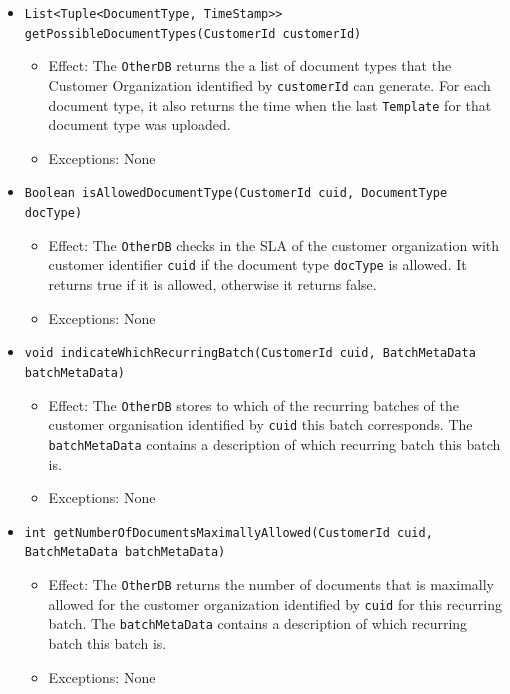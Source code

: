 \documentclass[a4paper,10pt]{article}
\begin{document}
\begin{itemize}
\begin{itemize}
		\item \texttt{List<Tuple<DocumentType, TimeStamp>> getPossibleDocumentTypes(CustomerId customerId)}
		\begin{itemize}
            \item Effect: The \texttt{OtherDB} returns the a list of document types that the Customer Organization identified by \texttt{customerId} can generate. For each document type, it also returns the time when the last \texttt{Template} for that document type was uploaded.  
            \item Exceptions: None
        \end{itemize} 
        
		\item \texttt{Boolean isAllowedDocumentType(CustomerId cuid, DocumentType docType)}        
		\begin{itemize}
			\item Effect: The \texttt{OtherDB} checks in the SLA of the customer organization with customer identifier \texttt{cuid} if the document type \texttt{docType} is allowed. It returns true if it is allowed, otherwise it returns false.
			\item Exceptions: None
		\end{itemize}		        
        
        	\item \texttt{void indicateWhichRecurringBatch(CustomerId cuid, BatchMetaData batchMetaData) }        
		\begin{itemize}
			\item Effect: The \texttt{OtherDB} stores to which of the recurring batches of the customer organisation identified by \texttt{cuid} this batch corresponds. The \texttt{batchMetaData} contains a description of which recurring batch this batch is.
			\item Exceptions: None
		\end{itemize}	
     
           \item \texttt{int getNumberOfDocumentsMaximallyAllowed(CustomerId cuid, BatchMetaData batchMetaData) }        
		\begin{itemize}
			\item Effect: The \texttt{OtherDB} returns the number of documents that is maximally allowed for the customer organization identified by \texttt{cuid} for this recurring batch. The \texttt{batchMetaData} contains a description of which recurring batch this batch is.
			\item Exceptions: None
		\end{itemize} 
		

\end{itemize}
\end{itemize}
\end{document}
